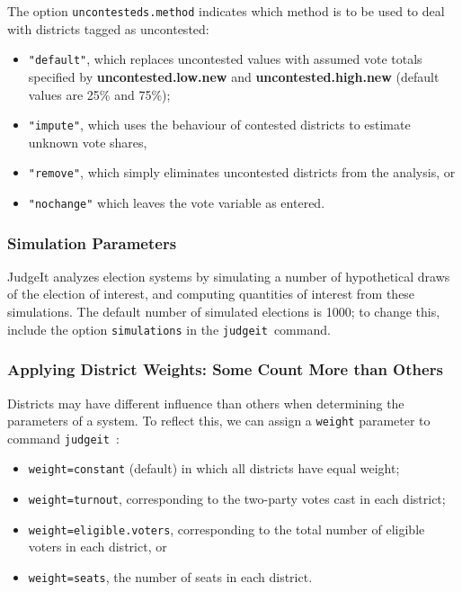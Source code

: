 \documentclass[oneside,letterpaper,titlepage]{article}
\newcommand{\jud}{\texttt{judgeit}\ }
\begin{document}
The option \texttt{uncontesteds.method} indicates which method is to be used
to deal with districts tagged as uncontested:
\begin{itemize}
\item \texttt{"default"}, which replaces uncontested values with
  assumed vote totals specified by \textbf{uncontested.low.new} and
  \textbf{uncontested.high.new} (default values are 25\% and 75\%);

\item \texttt{"impute"}, which uses the behaviour of contested
  districts to estimate unknown vote shares,

\item \texttt{"remove"}, which simply eliminates uncontested districts
  from the analysis, or

\item \texttt{"nochange"} which leaves the vote variable as entered.
\end{itemize}

\subsubsection{Simulation Parameters}

JudgeIt analyzes election systems by simulating a number of
hypothetical draws of the election of interest, and computing
quantities of interest from these simulations. The default number of simulated elections is 1000; to change this, include the option \texttt{simulations} in the \jud command.

\subsubsection{Applying District Weights: Some Count More than Others}

Districts may have different influence than others when determining
the parameters of a system. To reflect this, we can assign a
\texttt{weight} parameter to command \jud:

\begin{itemize}
\item \texttt{weight=constant} (default) in which all districts have equal
weight;

\item \texttt{weight=turnout}, corresponding to the two-party votes cast in each
district;

\item \texttt{weight=eligible.voters}, corresponding to the total number of eligible voters
in each district, or

\item \texttt{weight=seats}, the number of seats in each district.
\end{itemize}
\end{document}
